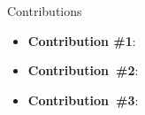 
\begin{frame}{Contributions}
  \begin{itemize}
    \item \textbf{Contribution \#1}:
    \item \textbf{Contribution~\#2}:
    \item \textbf{Contribution~\#3}:
  \end{itemize}
\end{frame}

